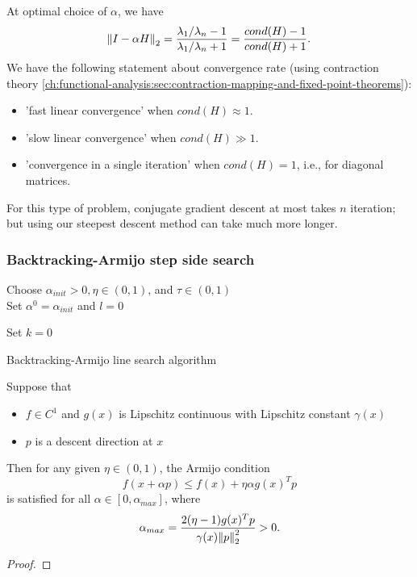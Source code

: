 \begin{refsection}
\begin{remark}
At optimal choice of $\alpha$, we have
$$\norm{I - \alpha H}_2 = \frac{\lambda_1/\lambda_n - 1}{\lambda_1/\lambda_n + 1} = \frac{cond(H)-1}{cond(H)+1}.$$
We have the following statement about convergence rate (using contraction theory \autoref{ch:functional-analysis:sec:contraction-mapping-and-fixed-point-theorems}):
\begin{itemize}
	\item 'fast linear convergence' when $cond(H) \approx 1$.
	\item 'slow linear convergence' when $cond(H) \gg 1$.
	\item 'convergence in a single iteration' when $cond(H) = 1$, i.e., for diagonal matrices. 
\end{itemize}
\end{remark}

\begin{remark}
For this type of problem, conjugate gradient descent at most takes $n$ iteration; but using our steepest descent method can take much more longer.
\end{remark}

\subsubsection{Backtracking-Armijo step side search}
\begin{algorithm}[H]
	\SetAlgoLined
	Choose $\alpha_{init} > 0, \eta \in (0,1)$, and $\tau\in (0,1)$\\
	Set $\alpha^0 = \alpha_{init}$ and $l = 0$
	
	
	Set $k = 0$
	\caption{Backtracking-Armijo line search algorithm}
\end{algorithm}

\begin{lemma}
Suppose that
\begin{itemize}
	\item $f\in C^1$ and $g(x)$ is Lipschitz continuous with Lipschitz constant $\gamma(x)$
	\item $p$ is a descent direction at $x$
\end{itemize}
Then for any given $\eta\in (0,1)$, the Armijo condition
$$f(x+\alpha p) \leq f(x) + \eta \alpha g(x)^T p$$
is satisfied for all $\alpha \in [0,\alpha_{max}]$, where
$$\alpha_{max} = \frac{2(\eta - 1)g(x)^T p}{\gamma(x)\norm{p}_2^2} > 0.$$
\end{lemma}
\begin{proof}


\end{proof}
\end{refsection}
